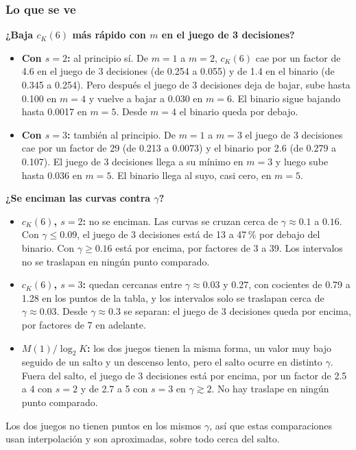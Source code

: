 \documentclass[11pt,letterpaper]{article}
\begin{document}
\subsubsection*{Lo que se ve}
\textbf{¿Baja $c_K(6)$ más rápido con $m$ en el juego de 3 decisiones?}
\begin{itemize}
\item \textbf{Con $s=2$:} al principio sí. De $m=1$ a $m=2$, $c_K(6)$ cae por un factor de 4.6 en el juego de 3 decisiones (de 0.254 a 0.055) y de 1.4 en el binario (de 0.345 a 0.254). Pero después el juego de 3 decisiones deja de bajar, sube hasta 0.100 en $m=4$ y vuelve a bajar a 0.030 en $m=6$. El binario sigue bajando hasta 0.0017 en $m=5$. Desde $m=4$ el binario queda por debajo.
\item \textbf{Con $s=3$:} también al principio. De $m=1$ a $m=3$ el juego de 3 decisiones cae por un factor de 29 (de 0.213 a 0.0073) y el binario por 2.6 (de 0.279 a 0.107). El juego de 3 decisiones llega a su mínimo en $m=3$ y luego sube hasta 0.036 en $m=5$. El binario llega al suyo, casi cero, en $m=5$.
\end{itemize}

\textbf{¿Se enciman las curvas contra $\gamma$?}
\begin{itemize}
\item \textbf{$c_K(6)$, $s=2$:} no se enciman. Las curvas se cruzan cerca de $\gamma\approx 0.1$ a $0.16$. Con $\gamma\le 0.09$, el juego de 3 decisiones está de 13 a 47\,\% por debajo del binario. Con $\gamma\ge 0.16$ está por encima, por factores de 3 a 39. Los intervalos no se traslapan en ningún punto comparado.
\item \textbf{$c_K(6)$, $s=3$:} quedan cercanas entre $\gamma\approx 0.03$ y $0.27$, con cocientes de 0.79 a 1.28 en los puntos de la tabla, y los intervalos solo se traslapan cerca de $\gamma\approx 0.03$. Desde $\gamma\approx 0.3$ se separan: el juego de 3 decisiones queda por encima, por factores de 7 en adelante.
\item \textbf{$M(1)/\log_2 K$:} los dos juegos tienen la misma forma, un valor muy bajo seguido de un salto y un descenso lento, pero el salto ocurre en distinto $\gamma$. Fuera del salto, el juego de 3 decisiones está por encima, por un factor de 2.5 a 4 con $s=2$ y de 2.7 a 5 con $s=3$ en $\gamma\gtrsim 2$. No hay traslape en ningún punto comparado.
\end{itemize}

Los dos juegos no tienen puntos en los mismos $\gamma$, así que estas comparaciones usan interpolación y son aproximadas, sobre todo cerca del salto.
\end{document}
